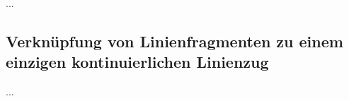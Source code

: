 \documentclass[../main/thesis.tex]{subfiles}
\begin{document}


...


\subsection{Verknüpfung von Linienfragmenten zu einem einzigen kontinuierlichen Linienzug}

...


\end{document}
